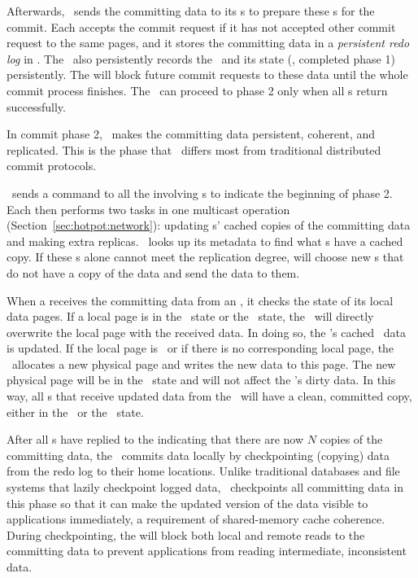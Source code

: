 Afterwards, \xn\ sends the committing data to its \on{}s 
to prepare these \on{}s for the commit.
Each \on{} accepts the commit request if it has not accepted other commit request to the same pages,
and it stores the committing data in a {\em persistent redo log} in \nvm.
The \on\ also persistently records the \xactid\ and its state (\ie, completed phase 1) persistently.
The \on{} will block future commit requests to these data until the whole commit process finishes.
The \xn\ can proceed to phase 2 only when all \on{}s return successfully.

In commit phase 2, \hotpot\ makes the committing data persistent, 
coherent, and replicated.
This is the phase that \hotpot\ differs most from traditional distributed commit protocols.

\xn\ sends a command to all the involving \on{}s to indicate the beginning of phase 2.  
Each \on{} then performs two tasks in one multicast operation (Section~\ref{sec:hotpot:network}): 
updating \dn{}s' cached copies of the committing data and making extra replicas.
\on\ looks up its metadata to find what \dn{}s have a cached copy.
If these \dn{}s alone cannot meet the replication degree, \on{} will choose new \dn{}s that do not have
a copy of the data and send the data to them.

When a \dn{} receives the committing data from an \on,
it checks the state of its local data pages.
If a local page is in the \committed\ state or the \redundant\ state, 
the \dn\ will directly overwrite the local page with the received data.
In doing so, the \dn's cached \nvm\ data is updated.
If the local page is \dirty\  or if there is no corresponding local page,
the \dn\ allocates a new physical page and writes the new data to this page.
The new physical page will be in the \redundant\ state and will not affect the \dn's dirty data.
In this way, all \dn{}s that receive updated data from the \on\ will 
have a clean, committed copy, either in the \committed\ or the \redundant\ state.

After all \dn{}s have replied to the \on{} indicating that there are now $N$ copies of the committing data,
the \on\ commits data locally
by checkpointing (copying) data from the redo log to their home locations.
Unlike traditional databases and file systems that lazily checkpoint logged data, 
\hotpot\ checkpoints all committing data in this phase 
so that it can make the updated version of the data
visible to applications immediately, 
a requirement of shared-memory cache coherence.
During checkpointing, the \on{} will block both local and remote reads to the committing data
to prevent applications from reading intermediate, inconsistent data.

